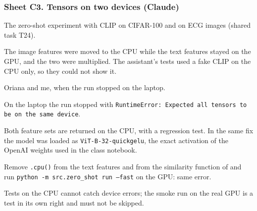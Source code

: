 \subsubsection*{Sheet C3. Tensors on two devices (Claude)}
\begin{description}[style=nextline,leftmargin=1.2em]
  \item[Prompt] The zero-shot experiment with CLIP on CIFAR-100 and on ECG images (shared task T24).
  \item[Faulty response] The image features were moved to the CPU while the text features stayed on the
        GPU, and the two were multiplied. The assistant's tests used a fake CLIP on the CPU only, so they
        could not show it.
  \item[Detected by] Oriana and me, when the run stopped on the laptop.
  \item[Proof] On the laptop the run stopped with \texttt{RuntimeError: Expected all tensors to be on the
        same device}.
  \item[Correction] Both feature sets are returned on the CPU, with a regression test. In the same fix the
        model was loaded as \texttt{ViT-B-32-quickgelu}, the exact activation of the OpenAI weights used in the
        class notebook.
  \item[Reproduction] Remove \texttt{.cpu()} from the text features and from the similarity function of
         and run \texttt{python -m src.zero\_shot run --fast} on the GPU: same error.
  \item[Reflection] Tests on the CPU cannot catch device errors; the smoke run on the real GPU is a test in
        its own right and must not be skipped.
\end{description}

